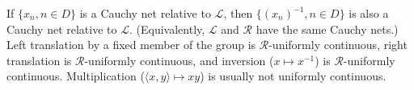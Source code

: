 If $\{x_n, n \in D\}$ is a Cauchy net relative to $\mathcal{L}$, then $\{(x_n)^{-1}, n \in D\}$ is also a Cauchy net relative to $\mathcal{L}$. (Equivalently, $\mathcal{L}$ and $\mathcal{R}$ have the same Cauchy nets.) Left translation by a fixed member of the group is $\mathcal{R}$-uniformly continuous, right translation is $\mathcal{R}$-uniformly continuous, and inversion ($x \mapsto x^{-1}$) is $\mathcal{R}$-uniformly continuous. Multiplication ($\langle x, y \rangle \mapsto xy$) is usually not uniformly continuous.
